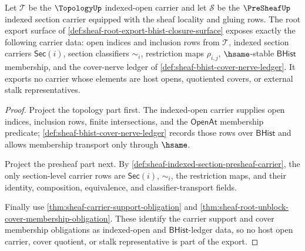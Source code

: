 \begin{theorem}
\label{thm:sheaf-root-export-carrier-scope}
Let $\mathcal{T}$ be the $\TopologyUp$ indexed-open carrier and let $\mathcal{S}$ be the $\PreSheafUp$ indexed section carrier equipped with the sheaf locality and gluing rows. The root export surface of \autoref{def:sheaf-root-export-bhist-closure-surface} exposes exactly the following carrier data: open indices and inclusion rows from $\mathcal{T}$, indexed section carriers $\mathsf{Sec}(i)$, section classifiers $\sim_i$, restriction maps $\rho_{i,j}$, $\hsame$-stable $\mathsf{BHist}$ membership, and the cover-nerve ledger of \autoref{def:sheaf-bhist-cover-nerve-ledger}. It exports no carrier whose elements are host opens, quotiented covers, or external stalk representatives.
\end{theorem}
\begin{proof}
Project the topology part first. The indexed-open carrier supplies open indices, inclusion rows, finite intersections, and the $\mathsf{OpenAt}$ membership predicate; \autoref{def:sheaf-bhist-cover-nerve-ledger} records those rows over $\mathsf{BHist}$ and allows membership transport only through $\hsame$.

Project the presheaf part next. By \autoref{def:sheaf-indexed-section-presheaf-carrier}, the only section-level carrier rows are $\mathsf{Sec}(i)$, $\sim_i$, the restriction maps, and their identity, composition, equivalence, and classifier-transport fields.

Finally use \autoref{thm:sheaf-carrier-support-obligation} and \autoref{thm:sheaf-root-unblock-cover-membership-obligation}. These identify the carrier support and cover membership obligations as indexed-open and $\mathsf{BHist}$-ledger data, so no host open carrier, cover quotient, or stalk representative is part of the export.
\end{proof}


